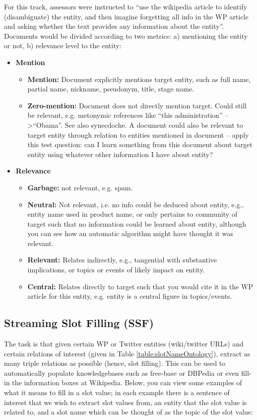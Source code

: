 For this track, assessors were instructed to ``use the wikipedia article to identify (disambiguate) the entity, and then imagine forgetting all info in the WP article and asking whether the text provides any information about the entity''\cite{JFrank12}. Documents would be divided according to two metrics: a) mentioning the entity or not, b) relevance level to the entity:
\begin{itemize}
\item \textbf{Mention} 
\begin{itemize}
\item \textbf{Mention:} Document explicitly mentions target entity, such as full name, partial name, nickname, pseudonym, title, stage name.
\item \textbf{Zero-mention:} Document does not directly mention target. Could still be relevant, e.g. metonymic references like ``this administration'' -- \textgreater ``Obama''. See also synecdoche. A document could also be relevant to target entity through relation to entities mentioned in document -- apply this test question: can I learn something from this document about target entity using whatever other information I have about entity?
\end{itemize}
\item \textbf{Relevance}
\begin{itemize}
\item \textbf{Garbage:} not relevant, e.g. spam.
\item \textbf{Neutral:} Not relevant, i.e. no info could be deduced about entity, e.g., entity name used in product name, or only pertains to community of target such that no information could be learned about entity, although you can see how an automatic algorithm might have thought it was relevant.
\item \textbf{Relevant:} Relates indirectly, e.g., tangential with substantive implications, or topics or events of likely
impact on entity.
\item \textbf{Central:} Relates directly to target such that you would cite it in the WP article for this entity, e.g. entity is a
central figure in topics/events.

\end{itemize}
\end{itemize}


\subsection{Streaming Slot Filling (SSF)}
The task is that given certain WP or Twitter entities 
(wiki/twitter URLs) and certain relations of interest (given in Table  \ref{table:slotNameOntology}), extract as many triple relations as possible (hence, slot filling). This can be used to automatically populate knowledgebases such as free-base or DBPedia 
or even fill-in the information boxes at Wikipedia. Below, you can view some examples of what it means to fill in a slot value; in each example there is a sentence of interest that we wish to extract slot values from, an entity that the slot value is related to, and a slot name which can be thought of as the topic of the slot value:


